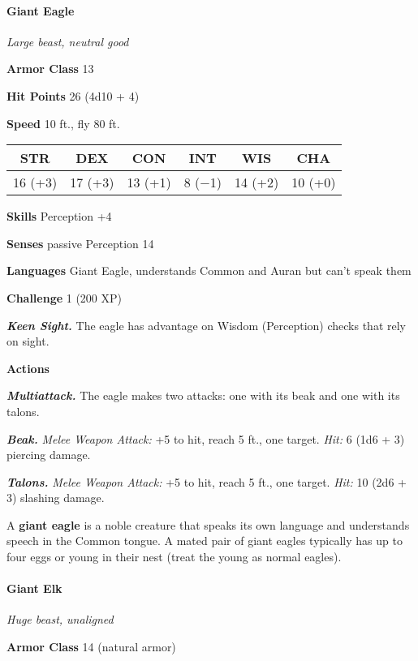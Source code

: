 \documentclass[
]{article}
\begin{document}
\hypertarget{giant-eagle}{%
\paragraph{Giant Eagle}\label{giant-eagle}}

\emph{Large beast, neutral good}

\textbf{Armor Class} 13

\textbf{Hit Points} 26 (4d10 + 4)

\textbf{Speed} 10 ft., fly 80 ft.

\begin{longtable}[]{@{}cccccc@{}}
\toprule
STR & DEX & CON & INT & WIS & CHA\tabularnewline
\midrule
\endhead
16 (+3) & 17 (+3) & 13 (+1) & 8 (−1) & 14 (+2) & 10 (+0)\tabularnewline
\bottomrule
\end{longtable}

\textbf{Skills} Perception +4

\textbf{Senses} passive Perception 14

\textbf{Languages} Giant Eagle, understands Common and Auran but can't
speak them

\textbf{Challenge} 1 (200 XP)

\emph{\textbf{Keen Sight.}} The eagle has advantage on Wisdom
(Perception) checks that rely on sight.

\textbf{Actions}

\emph{\textbf{Multiattack.}} The eagle makes two attacks: one with its
beak and one with its talons.

\emph{\textbf{Beak.}} \emph{Melee Weapon Attack:} +5 to hit, reach 5
ft., one target. \emph{Hit:} 6 (1d6 + 3) piercing damage.

\emph{\textbf{Talons.}} \emph{Melee Weapon Attack:} +5 to hit, reach 5
ft., one target. \emph{Hit:} 10 (2d6 + 3) slashing damage.

A \textbf{giant eagle} is a noble creature that speaks its own language
and understands speech in the Common tongue. A mated pair of giant
eagles typically has up to four eggs or young in their nest (treat the
young as normal eagles).

\hypertarget{giant-elk}{%
\paragraph{Giant Elk}\label{giant-elk}}

\emph{Huge beast, unaligned}

\textbf{Armor Class} 14 (natural armor)
\end{document}

